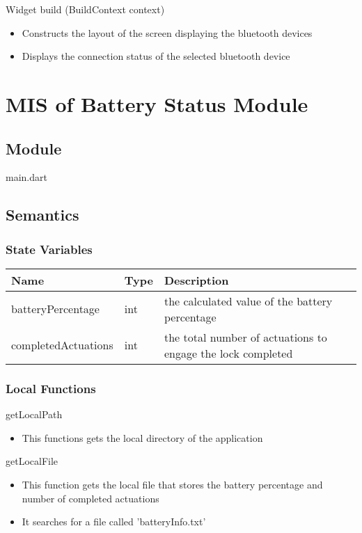 \documentclass[12pt, titlepage]{article}
\begin{document}
\noindent Widget build (BuildContext context)
\begin{itemize}
\item Constructs the layout of the screen displaying the bluetooth devices
\item Displays the connection status of the selected bluetooth device
\end{itemize}

\section{MIS of Battery Status Module} \label{mHD}

\subsection{Module}
main.dart

\subsection{Semantics}

\subsubsection{State Variables}

\begin{center}
\begin{tabular}{p{4cm} p{4cm} p{6cm}}
\hline
\textbf{Name} & \textbf{Type} & \textbf{Description} \\
\hline
batteryPercentage & int & the calculated value of the battery percentage \\
completedActuations & int & the total number of actuations to engage the lock completed \\
\hline
\end{tabular}
\end{center}

\subsubsection{Local Functions}

\noindent getLocalPath
\begin{itemize}
\item This functions gets the local directory of the application
\end{itemize}

\noindent getLocalFile
\begin{itemize}
\item This function gets the local file that stores the battery percentage and number of completed actuations 
\item It searches for a file called 'batteryInfo.txt'
\end{itemize}
\end{document}
